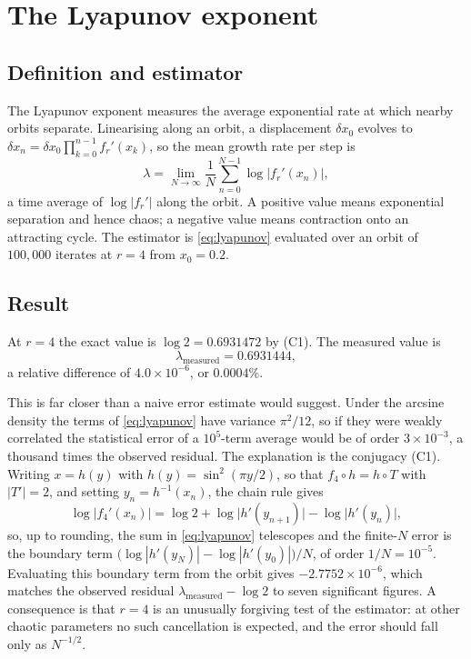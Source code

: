 \documentclass[11pt,a4paper]{article}
\theoremstyle{definition}
\theoremstyle{remark}
\newcommand{\logmap}{f_r}
\begin{document}
\section{The Lyapunov exponent}
\label{sec:lyapunov}

\subsection{Definition and estimator}

The Lyapunov exponent measures the average exponential rate at which nearby
orbits separate. Linearising along an orbit, a displacement $\delta x_0$
evolves to $\delta x_n=\delta x_0\prod_{k=0}^{n-1}\logmap'(x_k)$, so the mean
growth rate per step is
\begin{equation}
  \lambda = \lim_{N\to\infty}\frac{1}{N}\sum_{n=0}^{N-1}\log\bigl|\logmap'(x_n)\bigr| ,
  \label{eq:lyapunov}
\end{equation}
a time average of $\log|\logmap'|$ along the orbit. A positive value means
exponential separation and hence chaos; a negative value means contraction
onto an attracting cycle. The estimator is \eqref{eq:lyapunov} evaluated over
an orbit of $100{,}000$ iterates at $r=4$ from $x_0=0.2$.


\subsection{Result}

At $r=4$ the exact value is $\log2 = 0.6931472$ by (C1). The measured value is
\begin{equation}
  \lambda_{\text{measured}} = 0.6931444 ,
\end{equation}
a relative difference of $4.0\times10^{-6}$, or $0.0004$\%.

This is far closer than a naive error estimate would suggest. Under the
arcsine density the terms of \eqref{eq:lyapunov} have variance $\pi^2/12$, so
if they were weakly correlated the statistical error of a $10^{5}$-term
average would be of order $3\times10^{-3}$, a thousand times the observed
residual. The explanation is the conjugacy (C1). Writing $x=h(y)$ with
$h(y)=\sin^2(\pi y/2)$, so that $f_4\circ h=h\circ T$ with $|T'|=2$, and
setting $y_n=h^{-1}(x_n)$, the chain rule gives
\begin{equation}
  \log\bigl|f_4'(x_n)\bigr| = \log 2 + \log\bigl|h'(y_{n+1})\bigr| - \log\bigl|h'(y_n)\bigr| ,
  \label{eq:telescope}
\end{equation}
so, up to rounding, the sum in \eqref{eq:lyapunov} telescopes and the
finite-$N$ error is the boundary term
$\bigl(\log|h'(y_N)|-\log|h'(y_0)|\bigr)/N$, of order $1/N=10^{-5}$.
Evaluating this boundary term from the orbit gives $-2.7752\times10^{-6}$,
which matches the observed residual $\lambda_{\text{measured}}-\log 2$ to
seven significant figures. A consequence is that $r=4$ is an
unusually forgiving test of the estimator: at other chaotic parameters no such
cancellation is expected, and the error should fall only as $N^{-1/2}$.
\end{document}
